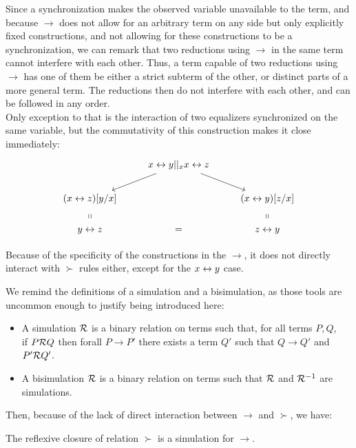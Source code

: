 \begin{myproof}
Since a synchronization makes the observed variable unavailable to the term, and because $\to$ does not allow for an arbitrary term on any side but only explicitly fixed constructions, and not allowing for these constructions to be a synchronization, we can remark that two reductions using $\to$ in the same term cannot interfere with each other. Thus, a term capable of two reductions using $\to$ has one of them be either a strict subterm of the other, or distinct parts of a more general term. The reductions then do not interfere with each other, and can be followed in any order.\\
Only exception to that is the interaction of two equalizers synchronized on the same variable, but the commutativity of this construction makes it close immediately:\\
\[\begin{tikzcd}
& x\tto y ||_x x\tto z \arrow[dl] \arrow[dr] &\\
(x\tto z)[y/x]\arrow[d, phantom, "\shortparallel"] & & (x\tto y)[z/x]\arrow[d, phantom, "\shortparallel"]\\
y\tto z & = & z\tto y
\end{tikzcd}\]
\end{myproof}

Because of the specificity of the constructions in the $\to$, it does not directly interact with $\succ$ rules either, except for the $x\leftrightarrow y$ case.

We remind the definitions of a simulation and a bisimulation, as those tools are uncommon enough to justify being introduced here:

\begin{definition}
\begin{itemize}
	\item A simulation $\mathcal{R}$ is a binary relation on terms such that, for all terms $P,Q$,\\
		if $P \mathcal{R} Q$ then forall $P \to P'$ there exists a term $Q'$ such that $Q \to Q'$ and $P' \mathcal{R} Q'$.
	\item A bisimulation $\mathcal{R}$ is a binary relation on terms such that $\mathcal{R}$ and $\mathcal{R}^{-1}$ are simulations.
\end{itemize}
\end{definition}

Then, because of the lack of direct interaction between $\to$ and $\succ$, we have:

\begin{proposition}
The reflexive closure of relation $\succ$ is a simulation for $\to$.
\end{proposition}

